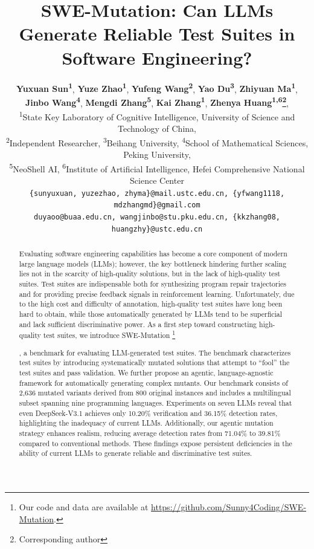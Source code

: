 \documentclass[11pt]{article}
\title{SWE-Mutation: Can LLMs Generate Reliable Test Suites in Software Engineering?}
\author{
 \textbf{Yuxuan Sun\textsuperscript{1}},
 \textbf{Yuze Zhao\textsuperscript{1}},
 \textbf{Yufeng Wang\textsuperscript{2}},
 \textbf{Yao Du\textsuperscript{3}},
 \textbf{Zhiyuan Ma\textsuperscript{1}},
 \\
 \textbf{Jinbo Wang\textsuperscript{4}},
 \textbf{Mengdi Zhang\textsuperscript{5}},
 \textbf{Kai Zhang\textsuperscript{1}},
 \textbf{Zhenya Huang\textsuperscript{1,6}\thanks{Corresponding author}},
\\
 \textsuperscript{1}State Key Laboratory of Cognitive Intelligence, University of Science and Technology of China,
 \\
 \textsuperscript{2}Independent Researcher,
 \textsuperscript{3}Beihang University,
 \textsuperscript{4}School of Mathematical Sciences, Peking University,
 \\
 \textsuperscript{5}NeoShell AI,
 \textsuperscript{6}Institute of Artificial Intelligence, Hefei Comprehensive National Science Center
\\
   \small\texttt{\{sunyuxuan, yuzezhao, zhyma\}@mail.ustc.edu.cn, \{yfwang1118, mdzhangmd\}@gmail.com}\\
    \small\texttt{duyaoo@buaa.edu.cn, wangjinbo@stu.pku.edu.cn, \{kkzhang08, huangzhy\}@ustc.edu.cn}
 }
\newcommand\blfootnote[1]{%
  \begingroup
  \renewcommand\thefootnote{}\footnote{#1}%
  \addtocounter{footnote}{-1}%
  \endgroup
}
\begin{document}
\maketitle
\begin{abstract}
Evaluating software engineering capabilities has become a core component of modern large language models (LLMs); however, the key bottleneck hindering further scaling lies not in the scarcity of high-quality solutions, but in the lack of high-quality test suites. Test suites are indispensable both for synthesizing program repair trajectories and for providing precise feedback signals in reinforcement learning. Unfortunately, due to the high cost and difficulty of annotation, high-quality test suites have long been hard to obtain, while those automatically generated by LLMs tend to be superficial and lack sufficient discriminative power. As a first step toward constructing high-quality test suites, we introduce SWE-Mutation\blfootnote{Our code and data are available at \url{https://github.com/Sunny4Coding/SWE-Mutation}.}, a benchmark for evaluating LLM-generated test suites. The benchmark characterizes test suites by introducing systematically mutated solutions that attempt to ``fool'' the test suites and pass validation. We further propose an agentic, language-agnostic framework for automatically generating complex mutants. Our benchmark consists of 2,636 mutated variants derived from 800 original instances and includes a multilingual subset spanning nine programming languages. Experiments on seven LLMs reveal that even DeepSeek-V3.1 achieves only 10.20\% verification and 36.15\% detection rates, highlighting the inadequacy of current LLMs. Additionally, our agentic mutation strategy enhances realism, reducing average detection rates from 71.04\% to 39.81\% compared to conventional methods. These findings expose persistent deficiencies in the ability of current LLMs to generate reliable and discriminative test suites.
\end{abstract}
\end{document}
